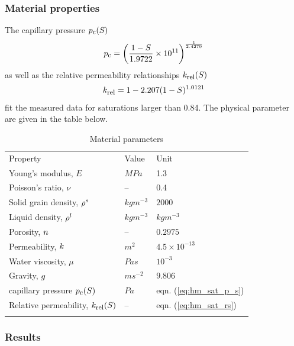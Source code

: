 \subsubsection*{Material properties}
The capillary pressure $p_{\mbox{\footnotesize c}}(S)$
\begin{eqnarray}
p_{\mbox{\footnotesize c}}
=
\left(
\frac{1-S}{1.9722}
\times 10^{11}
\right)^{\frac{1}{2.4279}}
\label{eq:hm_sat_p_s}
\end{eqnarray}
as well as the relative permeability relationships
$k_{\mbox{\footnotesize rel}}(S)$
\begin{eqnarray}
k_{\mbox{\footnotesize rel}}
=
1 - 2.207
(1-S)^{1.0121}
\label{eq:hm_sat_rs}
\end{eqnarray}
fit the measured data for saturations larger than 0.84. The physical parameter are given in the table below.
%

 \begin{table}[!htb]
\centering
\begin{tabular}{lll}
\hline\hline\noalign{\smallskip}
Property & Value & Unit \\
\noalign{\smallskip}\hline\noalign{\smallskip}
Young's modulus, $E$  &  $MPa$   &  1.3   \\
Poisson's ratio,  $\nu$  & -- &  0.4 \\
Solid grain density, $\rho^s$  &$kg m^{-3}$ & $2000$ \\
Liquid density, $\rho^l$       &$kg m^{-3}$ & $kg m^{-3}$ \\
Porosity, $n$            & --  & $0.2975$ \\
Permeability, $k$         & $ m^2$     & $4.5\times 10^{-13}$ \\
Water viscosity,  $\mu$      & $Pa s$     & $10^{-3} $ \\
Gravity,   $g$    &  $m s^{-2}$ & $9.806 $ \\
capillary pressure $p_{\mbox{\footnotesize c}}(S)$   &  $Pa$ & eqn. (\ref{eq:hm_sat_p_s}) \\
Relative permeability, $k_{\mbox{\footnotesize rel}}(S)$   &  -- & eqn. (\ref{eq:hm_sat_rs})\\
\noalign{\smallskip}\hline\hline
\end{tabular}
\caption{Material parameters}
\label{tab:hm_sat}
\end{table}





\subsubsection*{Results}

